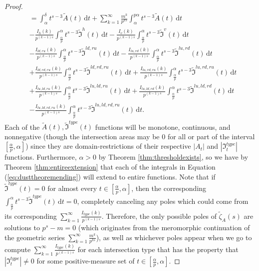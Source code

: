 \documentclass{article}
\theoremstyle{plain}
\numberwithin{equation}{section}
\numberwithin{table}{section}
\numberwithin{figure}{section}
\newcommand{\vaddspace}[1]{\rule{0pt}{#1pt}}
\newcommand{\newparagraph}{\vaddspace{10}}
\begin{document}
\begin{proof}
\begin{align}
&= \int_{\alpha}^{\delta} t^{s-3} \tilde{A}(t) \,\mathrm{d}t + \sum_{k=1}^{\infty} \frac{m^k}{p^{ks}} \int_{\alpha}^{p\alpha} t^{s-3} \tilde{A}(t) \,\mathrm{d}t\nonumber\\&
- \frac{I_{h}(k)}{p^{(k-1)s}} \int_{\frac{\alpha}{p}}^{\alpha} t^{s-3} \tilde{\mathfrak{I}}^{h}(t) \,\mathrm{d}t - \frac{I_{v}(k)}{p^{(k-1)s}} \int_{\frac{\alpha}{p}}^{\alpha} t^{s-3} \tilde{\mathfrak{I}}^{v}(t) \,\mathrm{d}t\nonumber\\&
- \frac{I_{ld,ru}(k)}{p^{(k-1)s}} \int_{\frac{\alpha}{p}}^{\alpha} t^{s-3} \tilde{\mathfrak{I}}^{ld,ru}(t) \,\mathrm{d}t - \frac{I_{lu,rd}(k)}{p^{(k-1)s}} \int_{\frac{\alpha}{p}}^{\alpha} t^{s-3} \tilde{\mathfrak{I}}^{lu,rd}(t) \,\mathrm{d}t\nonumber\\&
+ \frac{I_{ld,rd,ru}(k)}{p^{(k-1)s}} \int_{\frac{\alpha}{p}}^{\alpha} t^{s-3} \tilde{\mathfrak{I}}^{ld,rd,ru}(t) \,\mathrm{d}t + \frac{I_{lu,rd,ru}(k)}{p^{(k-1)s}} \int_{\frac{\alpha}{p}}^{\alpha} t^{s-3} \tilde{\mathfrak{I}}^{lu,rd,ru}(t) \,\mathrm{d}t\nonumber\\&
+ \frac{I_{lu,ld,ru}(k)}{p^{(k-1)s}} \int_{\frac{\alpha}{p}}^{\alpha} t^{s-3} \tilde{\mathfrak{I}}^{lu,ld,ru}(t) \,\mathrm{d}t + \frac{I_{lu,ld,rd}(k)}{p^{(k-1)s}} \int_{\frac{\alpha}{p}}^{\alpha} t^{s-3} \tilde{\mathfrak{I}}^{lu,ld,rd}(t) \,\mathrm{d}t\nonumber\\&
- \frac{I_{lu,ld,rd,ru}(k)}{p^{(k-1)s}} \int_{\frac{\alpha}{p}}^{\alpha} t^{s-3} \tilde{\mathfrak{I}}^{lu,ld,rd,ru}(t) \,\mathrm{d}t. \label{eq:dusttheoremending}
\end{align}
Each of the $\tilde{A}(t), \tilde{\mathfrak{I}}^{type}(t)$ functions will be monotone, continuous, and nonnegative (though the intersection areas may be 0 for all or part of the interval $\left[\frac{\alpha}{p}, \alpha\right]$) since they are domain-restrictions of their respective $|A_t|$ and $\left|\mathfrak{I}_t^{type}\right|$ functions. Furthermore, $\alpha > 0$ by Theorem \ref{thm:thresholdexists}, so we have by Theorem \ref{thm:entireextension} that each of the integrals in Equation (\ref{eq:dusttheoremending}) will extend to entire functions. Note that if $\tilde{\mathfrak{I}}^{type}(t) = 0$ for almost every $t \in \left[\frac{\alpha}{p}, \alpha\right]$, then the corresponding $\displaystyle\int_{\frac{\alpha}{p}}^{\alpha} t^{s-3} \tilde{\mathfrak{I}}^{type}(t) \,\mathrm{d}t = 0$, completely canceling any poles which could come from its corresponding $\displaystyle \sum_{k=1}^{\infty} \frac{I_{type}(k)}{p^{(k-1)s}}$. Therefore, the only possible poles of $\tilde{\zeta}_A(s)$ are solutions to $p^s - m = 0$ (which originates from the meromorphic continuation of the geometric series $\displaystyle \sum_{k=1}^{\infty} \frac{m^k}{p^{ks}}$), as well as whichever poles appear when we go to compute $\displaystyle \sum_{k=1}^{\infty} \frac{I_{type}(k)}{p^{(k-1)s}}$ for each intersection type that has the property that $\left|\mathfrak{I}_t^{type}\right| \neq 0$ for some positive-measure set of $t \in \left[\frac{\alpha}{p}, \alpha\right]$.
\end{proof}
\newparagraph
\end{document}
